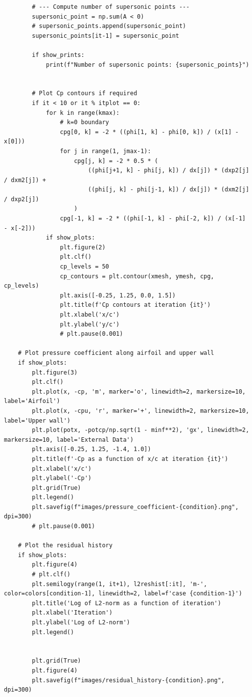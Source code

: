 \documentclass[12pt]{article}
\theoremstyle{definition}
\begin{document}
\begin{verbatim}
        # --- Compute number of supersonic points ---
        supersonic_point = np.sum(A < 0)
        # supersonic_points.append(supersonic_point)
        supersonic_points[it-1] = supersonic_point
        
        if show_prints:
            print(f"Number of supersonic points: {supersonic_points}")

        
        # Plot Cp contours if required
        if it < 10 or it % itplot == 0:
            for k in range(kmax):
                # k=0 boundary
                cpg[0, k] = -2 * ((phi[1, k] - phi[0, k]) / (x[1] - x[0]))
                for j in range(1, jmax-1):
                    cpg[j, k] = -2 * 0.5 * (
                        ((phi[j+1, k] - phi[j, k]) / dx[j]) * (dxp2[j] / dxm2[j]) +
                        ((phi[j, k] - phi[j-1, k]) / dx[j]) * (dxm2[j] / dxp2[j])
                    )
                cpg[-1, k] = -2 * ((phi[-1, k] - phi[-2, k]) / (x[-1] - x[-2]))
            if show_plots:
                plt.figure(2)
                plt.clf()
                cp_levels = 50
                cp_contours = plt.contour(xmesh, ymesh, cpg, cp_levels)
                plt.axis([-0.25, 1.25, 0.0, 1.5])
                plt.title(f'Cp contours at iteration {it}')
                plt.xlabel('x/c')
                plt.ylabel('y/c')
                # plt.pause(0.001)
    
    # Plot pressure coefficient along airfoil and upper wall
    if show_plots:
        plt.figure(3)
        plt.clf()
        plt.plot(x, -cp, 'm', marker='o', linewidth=2, markersize=10, label='Airfoil')
        plt.plot(x, -cpu, 'r', marker='+', linewidth=2, markersize=10, label='Upper wall')
        plt.plot(potx, -potcp/np.sqrt(1 - minf**2), 'gx', linewidth=2, markersize=10, label='External Data')
        plt.axis([-0.25, 1.25, -1.4, 1.0])
        plt.title(f'-Cp as a function of x/c at iteration {it}')
        plt.xlabel('x/c')
        plt.ylabel('-Cp')
        plt.grid(True)
        plt.legend()
        plt.savefig(f"images/pressure_coefficient-{condition}.png", dpi=300)
        # plt.pause(0.001)
    
    # Plot the residual history
    if show_plots:
        plt.figure(4)
        # plt.clf()
        plt.semilogy(range(1, it+1), l2reshist[:it], 'm-', color=colors[condition-1], linewidth=2, label=f'case {condition-1}')
        plt.title('Log of L2-norm as a function of iteration')
        plt.xlabel('Iteration')
        plt.ylabel('Log of L2-norm')
        plt.legend()
        

        plt.grid(True)
        plt.figure(4)
        plt.savefig(f"images/residual_history-{condition}.png", dpi=300)
                    

\end{verbatim}
\end{document}
